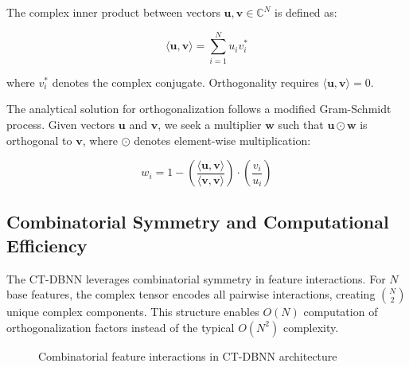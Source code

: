 \documentclass[journal]{IEEEtran}
\begin{document}
The complex inner product between vectors $\mathbf{u}, \mathbf{v} \in \mathbb{C}^N$ is defined as:

\begin{equation}
\langle \mathbf{u}, \mathbf{v} \rangle = \sum_{i=1}^N u_i v_i^*
\end{equation}

where $v_i^*$ denotes the complex conjugate. Orthogonality requires $\langle \mathbf{u}, \mathbf{v} \rangle = 0$.

The analytical solution for orthogonalization follows a modified Gram-Schmidt process. Given vectors $\mathbf{u}$ and $\mathbf{v}$, we seek a multiplier $\mathbf{w}$ such that $\mathbf{u} \odot \mathbf{w}$ is orthogonal to $\mathbf{v}$, where $\odot$ denotes element-wise multiplication:

\begin{equation}
w_i = 1 - \left( \frac{\langle \mathbf{u}, \mathbf{v} \rangle}{\langle \mathbf{v}, \mathbf{v} \rangle} \right) \cdot \left( \frac{v_i}{u_i} \right)
\end{equation}

\subsection{Combinatorial Symmetry and Computational Efficiency}

The CT-DBNN leverages combinatorial symmetry in feature interactions. For $N$ base features, the complex tensor encodes all pairwise interactions, creating $\binom{N}{2}$ unique complex components. This structure enables $O(N)$ computation of orthogonalization factors instead of the typical $O(N^2)$ complexity.

\begin{figure}[!ht]
\centering
{}
\caption{Combinatorial feature interactions in CT-DBNN architecture}
\label{fig:combinatorial}
\end{figure}
\end{document}
